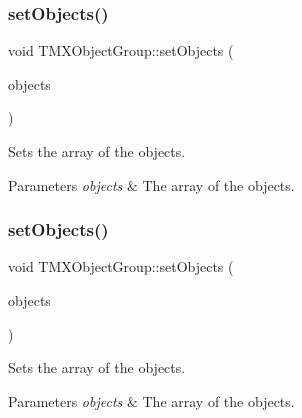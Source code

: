 \subsubsection{\texorpdfstring{set\+Objects()}{setObjects()}\hspace{0.1cm}{\footnotesize\ttfamily [1/2]}}
{\footnotesize\ttfamily void T\+M\+X\+Object\+Group\+::set\+Objects (\begin{DoxyParamCaption}\item[{const Value\+Vector \&}]{objects }\end{DoxyParamCaption})\hspace{0.3cm}{\ttfamily [inline]}}

Sets the array of the objects.


\begin{DoxyParams}{Parameters}
{\em objects} & The array of the objects. \\
\hline
\end{DoxyParams}
\mbox{\label{classTMXObjectGroup_afa4934557f0adc40d0e8e5c8d269bf5f}} 
\subsubsection{\texorpdfstring{set\+Objects()}{setObjects()}\hspace{0.1cm}{\footnotesize\ttfamily [2/2]}}
{\footnotesize\ttfamily void T\+M\+X\+Object\+Group\+::set\+Objects (\begin{DoxyParamCaption}\item[{const Value\+Vector \&}]{objects }\end{DoxyParamCaption})\hspace{0.3cm}{\ttfamily [inline]}}

Sets the array of the objects.


\begin{DoxyParams}{Parameters}
{\em objects} & The array of the objects. \\
\hline
\end{DoxyParams}
\mbox{\label{classTMXObjectGroup_a0280a11095c886a5e3f195f40377dd20}} 

